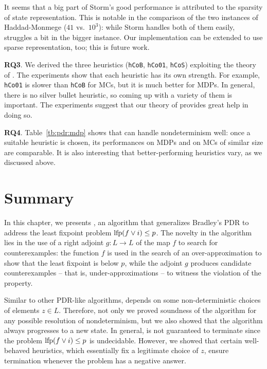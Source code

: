 It seems that a big part of Storm's good performance is attributed to the sparsity of state representation. This is notable in the comparison of the two instances of Haddad-Monmege ($41$ vs.\ $10^3$): while Storm handles both of them easily, \ADPDR{} struggles a bit in the bigger instance. Our implementation can be extended to use sparse representation, too; this is future work.

\textbf{RQ3}.
We derived the three heuristics (\verb|hCoB|, \verb|hCo01|, \verb|hCoS|) exploiting the theory of \ADPDR{}. The experiments show that each heuristic has its own strength. For example, \verb|hCo01| is slower than \verb|hCoB| for MCs, but it is much better for MDPs. In general, there is no silver bullet heuristic, so coming up with a variety of them is important. The experiments suggest that our theory of \ADPDR{} provides great help in doing so.

\textbf{RQ4}.
Table~\ref{tb:pdr:mdp} shows that \ADPDR{} can handle nondeterminism well: once a suitable heuristic is chosen, its performances on MDPs and on MCs of similar size are comparable. It is also interesting that better-performing heuristics vary, as we discussed above.

\section{Summary}\label{sec:pdr:conclusions}
In this chapter, we presents \APDR{}, an algorithm that generalizes Bradley's PDR \cite{Bradley11} to address the least fixpoint problem $\text{lfp}(f\lor i) \le p$. The novelty in the algorithm lies in the use of a right adjoint $g\colon L \to L$ of the map $f$ to search for counterexamples: the function $f$ is used in the search of an over-approximation to show that the least fixpoint is below $p$, while the adjoint $g$ produces candidate counterexamples -- that is, under-approximations -- to witness the violation of the property.

Similar to other PDR-like algorithms, \APDR{} depends on some non-deterministic choices of elements $z \in L$. Therefore, not only we proved soundness of the algorithm for any possible resolution of nondeterminism, but we also showed that the algorithm always progresses to a new state. In general, \APDR{} is not guaranteed to terminate since the problem $\text{lfp}(f\lor i) \le p$ is undecidable. However, we showed that certain well-behaved heuristics, which essentially fix a legitimate choice of $z$, ensure termination whenever the problem has a negative answer.


